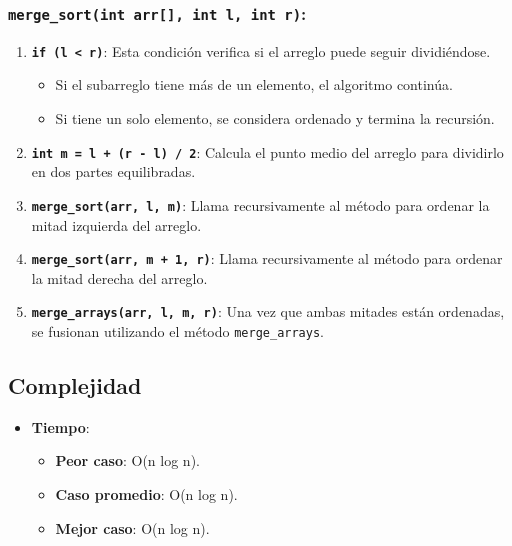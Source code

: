 \documentclass[
  spanish,
  letterpaper,
  DIV=11,
  numbers=noendperiod]{scrreprt}
\providecommand{\tightlist}{%
  \setlength{\itemsep}{0pt}\setlength{\parskip}{0pt}}
\begin{document}
\subsubsection{\texorpdfstring{\texttt{merge\_sort(int\ arr{[}{]},\ int\ l,\ int\ r)}:}{merge\_sort(int arr{[}{]}, int l, int r):}}\label{merge_sortint-arr-int-l-int-r}

\begin{enumerate}
\def\labelenumi{\arabic{enumi}.}
\item
  \textbf{\texttt{if\ (l\ \textless{}\ r)}}: Esta condición verifica si
  el arreglo puede seguir dividiéndose.

  \begin{itemize}
  \tightlist
  \item
    Si el subarreglo tiene más de un elemento, el algoritmo continúa.
  \item
    Si tiene un solo elemento, se considera ordenado y termina la
    recursión.
  \end{itemize}
\item
  \textbf{\texttt{int\ m\ =\ l\ +\ (r\ -\ l)\ /\ 2}}: Calcula el punto
  medio del arreglo para dividirlo en dos partes equilibradas.
\item
  \textbf{\texttt{merge\_sort(arr,\ l,\ m)}}: Llama recursivamente al
  método para ordenar la mitad izquierda del arreglo.
\item
  \textbf{\texttt{merge\_sort(arr,\ m\ +\ 1,\ r)}}: Llama recursivamente
  al método para ordenar la mitad derecha del arreglo.
\item
  \textbf{\texttt{merge\_arrays(arr,\ l,\ m,\ r)}}: Una vez que ambas
  mitades están ordenadas, se fusionan utilizando el método
  \texttt{merge\_arrays}.
\end{enumerate}

\subsection{Complejidad}\label{complejidad-1}

\begin{itemize}
\tightlist
\item
  \textbf{Tiempo}:

  \begin{itemize}
  \tightlist
  \item
    \textbf{Peor caso}: O(n log n).
  \item
    \textbf{Caso promedio}: O(n log n).
  \item
    \textbf{Mejor caso}: O(n log n).
  \end{itemize}
\end{itemize}
\end{document}
